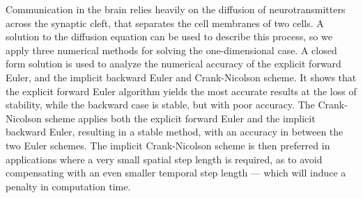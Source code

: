 
Communication in the brain relies heavily on the diffusion of neurotransmitters
across the synaptic cleft, that separates the cell membranes of two cells.
A solution to the diffusion equation can be used to describe this process, so 
we apply three numerical methods for solving the one-dimensional case. A closed
form solution is used to analyze the numerical accuracy of the explicit
forward Euler, and the implicit backward Euler and Crank-Nicolson scheme. It
shows that the explicit forward Euler algorithm yields the most accurate
results at the loss of stability, while the backward case is stable, but with
poor accuracy. The Crank-Nicolson scheme applies both
the explicit forward Euler and the implicit backward Euler, resulting in a
stable method, with an accuracy in between the two Euler schemes.
The implicit Crank-Nicolson scheme is
then preferred in applications where a very small spatial step length is required,
as to avoid compensating with an even smaller temporal step length --- which will
induce a penalty in computation time.

%
%

